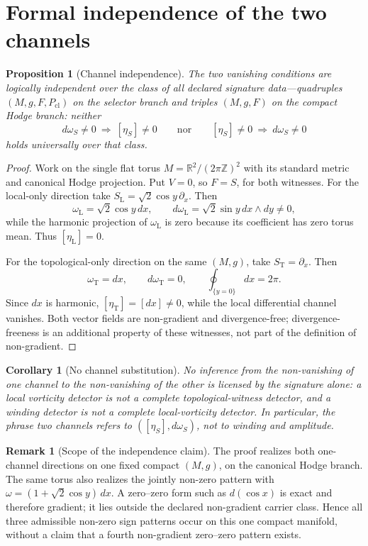 \documentclass[11pt]{article}
\newtheorem{proposition}[theorem]{Proposition}
\newtheorem{corollary}[theorem]{Corollary}
\theoremstyle{definition}
\newtheorem{remark}[theorem]{Remark}
\begin{document}
\section{Formal independence of the two channels}

\begin{proposition}[Channel independence]\label{prop:independence}
The two vanishing conditions are logically independent over the class of
all declared signature data---quadruples \((M,g,F,P_{\mathrm{cl}})\) on the
selector branch and triples \((M,g,F)\) on the compact Hodge branch: neither
\[
d\omega_S\neq0\ \Longrightarrow\ [\eta_S]\neq0
\qquad\text{nor}\qquad
[\eta_S]\neq0\ \Longrightarrow\ d\omega_S\neq0
\]
holds universally over that class.
\end{proposition}

\begin{proof}
Work on the single flat torus
\(M=\mathbb R^2/(2\pi\mathbb Z)^2\) with its standard metric and canonical
Hodge projection.  Put \(V=0\), so \(F=S\), for both witnesses.  For the
local-only direction take
\(S_{\mathrm L}=\sqrt2\cos y\,\partial_x\).  Then
\[
\omega_{\mathrm L}=\sqrt2\cos y\,dx,\qquad
d\omega_{\mathrm L}=\sqrt2\sin y\,dx\wedge dy\neq0,
\]
while the harmonic projection of \(\omega_{\mathrm L}\) is zero because its
coefficient has zero torus mean.  Thus \([\eta_{\mathrm L}]=0\).

For the topological-only direction on the same \((M,g)\), take
\(S_{\mathrm T}=\partial_x\).  Then
\[
\omega_{\mathrm T}=dx,\qquad d\omega_{\mathrm T}=0,\qquad
\oint_{\{y=0\}}dx=2\pi.
\]
Since \(dx\) is harmonic, \([\eta_{\mathrm T}]=[dx]\neq0\), while the local
differential channel vanishes.  Both vector fields are non-gradient and
divergence-free; divergence-freeness is an additional property of these
witnesses, not part of the definition of non-gradient.
\end{proof}

\begin{corollary}[No channel substitution]\label{cor:no-sub}
No inference from the non-vanishing of one channel to the non-vanishing of
the other is licensed by the signature alone: a local vorticity detector is
not a complete topological-witness detector, and a winding detector is not a
complete local-vorticity detector.  In particular, the phrase \emph{two
channels} refers to \(([\eta_S],d\omega_S)\), not to winding and amplitude.
\end{corollary}

\begin{remark}[Scope of the independence claim]
The proof realizes both one-channel directions on one fixed compact
\((M,g)\), on the canonical Hodge branch.  The same torus also realizes the
jointly non-zero pattern with
\(\omega=(1+\sqrt2\cos y)\,dx\).  A zero--zero form such as
\(d(\cos x)\) is exact and therefore gradient; it lies outside the declared
non-gradient carrier class.  Hence all three admissible non-zero sign patterns
occur on this one compact manifold, without a claim that a fourth
non-gradient zero--zero pattern exists.
\end{remark}
\end{document}
